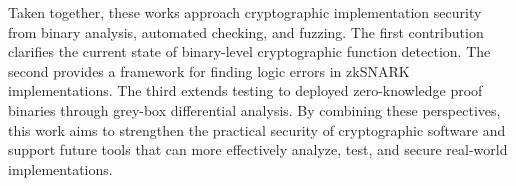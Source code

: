 Taken together, these works approach cryptographic implementation security from binary analysis, automated checking, and fuzzing. The first contribution clarifies the current state of binary-level cryptographic function detection. The second provides a framework for finding logic errors in zkSNARK implementations. The third extends testing to deployed zero-knowledge proof binaries through grey-box differential analysis. By combining these perspectives, this work aims to strengthen the practical security of cryptographic software and support future tools that can more effectively analyze, test, and secure real-world implementations.